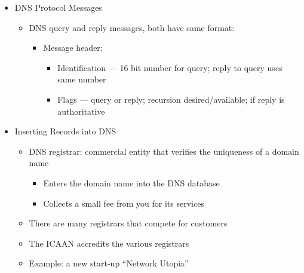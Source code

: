 \begin{itemize}
  \item DNS Protocol Messages

    \begin{itemize}

      \item DNS query and reply messages, both have same format:

        \begin{itemize}

          \item Message header:

            \begin{itemize}

              \item Identification — 16 bit number for query; reply to query uses same number

              \item Flags — query or reply; recursion desired/available; if reply is authoritative

            \end{itemize}

        \end{itemize}

    \end{itemize}

  \item Inserting Records into DNS

    \begin{itemize}

      \item DNS registrar: commercial entity that verifies the uniqueness of a domain name

        \begin{itemize}

          \item Enters the domain name into the DNS database

          \item Collects a small fee from you for its services

        \end{itemize}

      \item There are many registrars that compete for customers

      \item The ICAAN accredits the various registrars

      \item Example: a new start-up ``Network Utopia''


\end{itemize}
\end{itemize}
